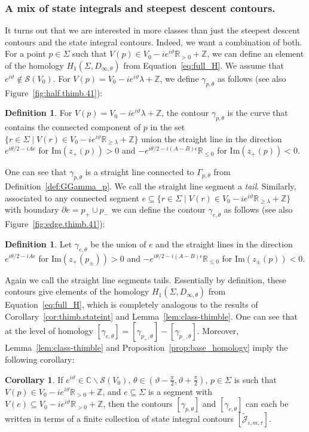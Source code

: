 \documentclass[12pt,reqno]{amsart}
\theoremstyle{definition}
\newtheorem{definition}[theorem]{Definition}
\newtheorem{corollary}[theorem]{Corollary}
\def\BZ{\mathbb Z}
\def\BR{\mathbb R}
\def\BC{\mathbb C}
\def\calJ{\mathcal J}
\def\Im{\mathrm{Im}}
\renewcommand{\=}{\;=\;}
\begin{document}
\subsubsection{A mix of state integrals and steepest descent contours.}
It turns out that we are interested in more classes than just the steepest descent contours and the state integral contours. Indeed, we want a combination of both. For a point $p\in\Sigma$ such that $V(p)\in V_0-i e^{i\vartheta}\BR_{>0}+\BZ$, we can define an element of the homology $H_1(\Sigma,D_{\infty,\theta})$ from Equation~\eqref{eq:full_H}. We assume that $e^{i\vartheta}\notin\mathcal{S}(V_0)$. For $V(p)=V_0-i e^{i\vartheta}\lambda+\BZ$, we define $\gamma_{p,\theta}$ as follows (see also Figure~\ref{fig:half.thimb.41}):
\begin{definition}\label{def:gamma_p}
For $V(p)=V_0-i e^{i\vartheta}\lambda+\BZ$, the contour $\gamma_{p,\theta}$ is the curve that contains the connected component of $p$ in the set $\{r\in\Sigma\;|\;V(r)\in V_0-i e^{i\vartheta}\BR_{\geq\lambda}+\BZ\}$ union the straight line in the direction $e^{i\theta/2-iA\epsilon}$ for $\Im(z_+(p))>0$ and $-e^{i\theta/2-i(A-B)\epsilon}\BR_{\leq0}$ for $\Im(z_+(p))<0$. 
\end{definition}
One can see that $\gamma_{p,\theta}$ is a straight line connected to $\Gamma_{p,\theta}$ from Definition~\ref{def:GGamma_p}. We call the straight line segment a \emph{tail}.
Similarly, associated to any connected segment $e\subseteq\{r\in\Sigma\;|\;V(r)\in V_0-i e^{i\vartheta}\BR_{\geq\lambda}+\BZ\}$ with boundary $\partial e=p_+\cup p_-$ we can define the contour $\gamma_{e,\theta}$ as follows (see also Figure~\ref{fig:edge.thimb.41}): 
\begin{definition}\label{def:gamma_e}
Let $\gamma_{e,\theta}$ be the union of $e$ and the straight lines in the direction $e^{i\theta/2-iA\epsilon}$ for $\Im(z_+(p_\pm))>0$ and $-e^{i\theta/2-i(A-B)\epsilon}\BR_{\leq0}$ for $\Im(z_\pm(p))<0$.
\end{definition}
Again we call the straight line segments tails. Essentially by definition, these contours give elements of the homology $H_1(\Sigma,D_{\infty,\theta})$ from Equation~\eqref{eq:full_H}, which is completely analogous to the results of Corollary~\ref{cor:thimb.stateint} and Lemma~\ref{lem:class-thimble}. One can see that at the level of homology $[\gamma_{e,\theta}]=[\gamma_{p_+,\theta}]-[\gamma_{p_-,\theta}]$. Moreover, Lemma~\ref{lem:class-thimble} and Proposition~\ref{prop:base_homology} imply the following corollary:
\begin{corollary}\label{cor:half.thimb.stateint}
If $e^{i\vartheta}\in\BC\backslash\mathcal{S}(V_{0})$, $\theta\in(\vartheta-\tfrac{\pi}{2},\vartheta+\tfrac{\pi}{2})$, $p\in\Sigma$ is such that $V(p)\in V_0-i e^{i\vartheta}\BR_{>0}+\BZ$, and $e\subseteq\Sigma$ is a segment with $V(e)\subseteq V_0-i e^{i\vartheta}\BR_{>0}+\BZ$, then the contours $[\gamma_{p,\theta}]$ and $[\gamma_{e,\theta}]$ can each be written in terms of a finite collection of state integral contours $[\tilde{\calJ}_{i,m,\tau}]$.
\end{corollary}
\end{document}
